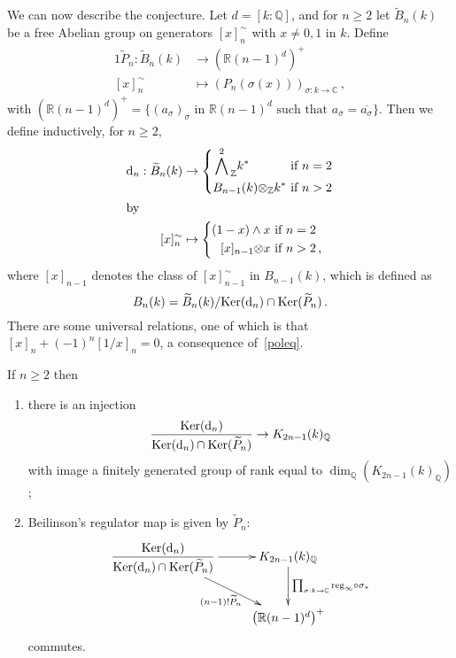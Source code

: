 \documentclass{amsart}
\begin{document}
We can now describe the conjecture.  Let $ d=[k:{\mathbb Q}] $, and for $ n \ge 2 $ let $ {\widetilde B}_n(k) $ be a free
Abelian group on generators $ [x]_n^\sim $ with $ x\ne 0,1 $ in $ k $.
Define
\begin{alignat*}{1}
\widetilde P_n : {\widetilde B}_n(k) & \to \left({\mathbb R}(n-1)^d\right)^+
\\
[x]_n^\sim & \mapsto (P_n({\sigma}(x)))_{{\sigma}: k \to {\mathbb C}}
\,,
\end{alignat*}
with
$ \left({\mathbb R}(n-1)^d\right)^+ = \{ (a_{\sigma})_{\sigma} \text{ in } {\mathbb R}(n-1)^d \text{ such that } a_{\bar{\sigma}} = \overline{a_{\sigma}} \} $.
Then we define inductively, for $ n \ge 2 $,
\begin{alignat*}{1}
{{\textup{d}}}_n : {\widetilde B}_n(k) & \to
 \left\{\begin{aligned}\bigwedge^2\lower 4pt\hbox{$ {}_{\mathbb Z} $} k^* \hbox to 30 pt{} & \text{ if $ n =2 $} \\ B_{n-1}(k) {\otimes}_{\mathbb Z} k^* & \text{ if $n>2$}\end{aligned} \right.
\\
\intertext{by}
[x]_n^\sim & \mapsto
   \left\{\begin{aligned}(1-x)\wedge x & \text{ if $ n =2 $} \\ [x]_{n-1} {\otimes} x & \text{ if $  n > 2 $\,,}\end{aligned} \right.
\end{alignat*}
where $ [x]_{n-1} $ denotes the class of $ [x]_{n-1}^\sim $ in $ B_{n-1}(k) $, which is defined as
$$
B_n(k) = {\widetilde B}_n(k)/ {\operatorname{Ker}}({{\textup{d}}}_n) \cap {\operatorname{Ker}}(\widetilde P_n)
\,.
$$
There are some universal relations, one of which is that $ [x]_n + (-1)^n [1/x]_n = 0 $, a consequence
of~\eqref{poleq}.

\begin{conjecture}\label{zagierconjecture}
If $ n \ge 2 $ then
\begin{enumerate}
\item
there is an injection
$$
\dfrac{{\operatorname{Ker}}({{\textup{d}}}_n)}{{\operatorname{Ker}}({{\textup{d}}}_n) \hskip-.5pt \cap {\operatorname{Ker}}(\widetilde P_n)} \to K_{2n-1}(k)_{\mathbb Q}
$$
with image a finitely generated group of rank equal to $ \dim_{\mathbb Q} ({K_{2n-1}(k)_{\mathbb Q}}) $;
\item
Beilinson's regulator map is given by $ \widetilde P_n $:
$$
\xymatrix{
\dfrac{{\operatorname{Ker}}({{\textup{d}}}_n)}{{\operatorname{Ker}}({{\textup{d}}}_n) \hskip-.5pt \cap {\operatorname{Ker}}(\widetilde P_n)} \ar[r]\ar[rd]_-{(n-1)!\widetilde P_n} & {K_{2n-1}(k)_{\mathbb Q}}\ar[d]^-{\prod_{{\sigma}: k \to {\mathbb C}} {\textup{reg}}_\infty\circ{\sigma}_*} \cr
  & \left({\mathbb R}(n-1)^d\right)^+
}
$$
commutes.
\end{enumerate}
\end{conjecture}
\end{document}

